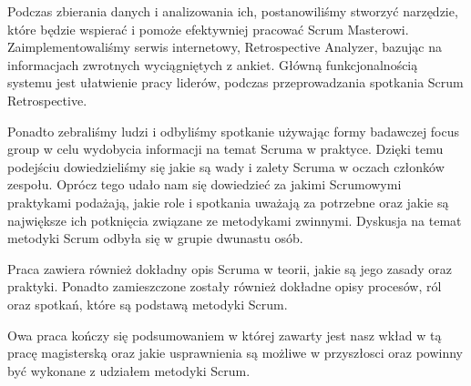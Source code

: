 \tab Podczas zbierania danych i analizowania ich, postanowiliśmy stworzyć narzędzie, które będzie wspierać i pomoże efektywniej pracować Scrum Masterowi. Zaimplementowaliśmy serwis internetowy, Retrospective Analyzer, bazując na informacjach zwrotnych wyciągniętych z ankiet. Główną funkcjonalnością systemu jest ułatwienie pracy liderów, podczas przeprowadzania spotkania Scrum Retrospective.

\tab Ponadto zebraliśmy ludzi i odbyliśmy spotkanie używając formy badawczej focus group w celu wydobycia informacji na temat Scruma w praktyce. Dzięki temu podejściu dowiedzieliśmy się jakie są wady i zalety Scruma w oczach członków zespołu. Oprócz tego udało nam się dowiedzieć za jakimi Scrumowymi praktykami podażają, jakie role i spotkania uważają za potrzebne oraz jakie są największe ich potknięcia związane ze metodykami zwinnymi. Dyskusja na temat metodyki Scrum odbyła się w grupie dwunastu osób.

\tab Praca zawiera również dokładny opis Scruma w teorii, jakie są jego zasady oraz praktyki. Ponadto zamieszczone zostały również dokładne opisy procesów, ról oraz spotkań, które są podstawą metodyki Scrum.

\tab Owa praca kończy się podsumowaniem w której zawarty jest nasz wkład w tą pracę magisterską oraz jakie usprawnienia są możliwe w przyszłosci oraz powinny być wykonane z udziałem metodyki Scrum. 



